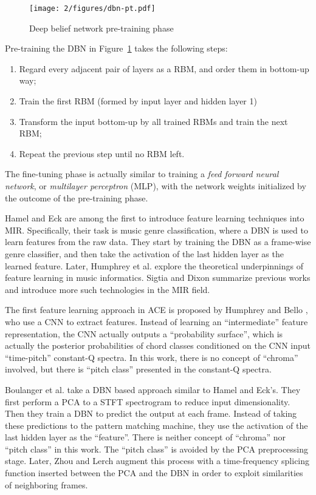 \begin{figure}[htb]
\centering
\texttt{[image: 2/figures/dbn-pt.pdf]}
\caption{Deep belief network pre-training phase}
\label{fig:2-dbn-pt}
\end{figure}
Pre-training the DBN in Figure~\ref{fig:2-dbn-pt} takes the following steps:
\begin{enumerate}
\item Regard every adjacent pair of layers as a RBM, and order them in bottom-up way;
\item Train the first RBM (formed by input layer and hidden layer 1)
\item Transform the input bottom-up by all trained RBMs and train the next RBM;
\item Repeat the previous step until no RBM left.
\end{enumerate}

The fine-tuning phase is actually similar to training a {\it feed forward neural network}, or {\it multilayer perceptron} (MLP), with the network weights initialized by the outcome of the pre-training phase. 

Hamel and Eck \cite{hamel2010learning} are among the first to introduce feature learning techniques into MIR. Specifically, their task is music genre classification, where a DBN is used to learn features from the raw data. They start by training the DBN as a frame-wise genre classifier, and then take the activation of the last hidden layer as the learned feature. Later, Humphrey et al. \cite{humphrey2013feature} explore the theoretical underpinnings of feature learning in music informatics. Sigtia and Dixon \cite{sigtia2014improved} summarize previous works and introduce more such technologies in the MIR field.

The first feature learning approach in ACE is proposed by Humphrey and Bello \cite{humphrey2012rethinking}, who use a CNN to extract features. Instead of learning an ``intermediate'' feature representation, the CNN actually outputs a ``probability surface'', which is actually the posterior probabilities of chord classes conditioned on the CNN input ``time-pitch'' constant-Q spectra. In this work, there is no concept of ``chroma'' involved, but there is ``pitch class'' presented in the constant-Q spectra.

Boulanger et al. \cite{boulanger2013audio} take a DBN based approach similar to Hamel and Eck's. They first perform a PCA to a STFT spectrogram to reduce input dimensionality. Then they train a DBN to predict the output at each frame. Instead of taking these predictions to the pattern matching machine, they use the activation of the last hidden layer as the ``feature''. There is neither concept of ``chroma'' nor ``pitch class'' in this work. The ``pitch class'' is avoided by the PCA preprocessing stage. Later, Zhou and Lerch \cite{zhou2015chord} augment this process with a time-frequency splicing function inserted between the PCA and the DBN in order to exploit similarities of neighboring frames.

